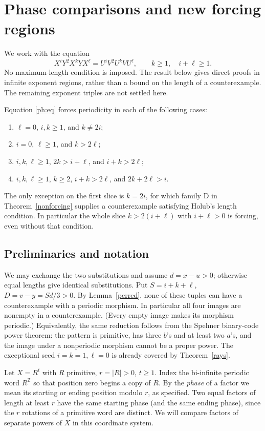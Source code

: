 \section{Phase comparisons and new forcing regions}
\label{sec:phase-comparisons}
We work with the equation
\begin{equation}\label{ph:eq}
 X^iY^2X^kYX^\ell=U^iV^2U^kVU^\ell,
 \qquad k\ge1,\quad i+\ell\ge1.
\end{equation}
No maximum-length condition is imposed. The result below gives direct
proofs in infinite exponent regions, rather than a bound on the length
of a counterexample. The remaining exponent triples are not settled here.

\begin{theorem}\label{ph:main}
Equation \eqref{ph:eq} forces periodicity in each of the following cases:
\begin{enumerate}
\item $\ell=0$, $i,k\ge1$, and $k\ne2i$;
\item $i=0$, $\ell\ge1$, and $k>2\ell$;
\item $i,k,\ell\ge1$, $2k>i+\ell$, and $i+k>2\ell$;
\item $i,k,\ell\ge1$, $k\ge2$, $i+k>2\ell$, and $2k+2\ell>i$.
\end{enumerate}
The only exception on the first slice is $k=2i$, for which family D in
Theorem~\ref{nonforcing} supplies a counterexample satisfying Holub's
length condition. In particular the whole slice $k>2(i+\ell)$ with
$i+\ell>0$ is forcing, even without that condition.
\end{theorem}

\subsection{Preliminaries and notation}
We may exchange the two substitutions and assume $d=x-u>0$;
otherwise equal lengths give identical substitutions. Put
$S=i+k+\ell$, $D=v-y=Sd/3>0$. By Lemma~\ref{perred}, none of
these tuples can have a counterexample with a periodic morphism.
In particular all four images are nonempty in a counterexample. (Every
empty image makes its morphism periodic.) Equivalently, the same
reduction follows from the Spehner binary-code power theorem: the
pattern is primitive, has three $b$'s and at least two $a$'s, and the
image under a nonperiodic morphism cannot be a proper power.
The exceptional seed $i=k=1,\ell=0$ is already covered by
Theorem~\ref{rays}.

Let $X=R^t$ with $R$ primitive, $r=|R|>0$, $t\ge1$. Index the
bi-infinite periodic word $R^{\mathbb Z}$ so that position zero begins a
copy of $R$. By the \emph{phase} of a factor we mean its starting or
ending position modulo $r$, as specified. Two equal factors of length
at least $r$ have the same starting phase (and the same ending phase),
since the $r$ rotations of a primitive word are distinct. We will
compare factors of separate powers of $X$ in this coordinate system.

